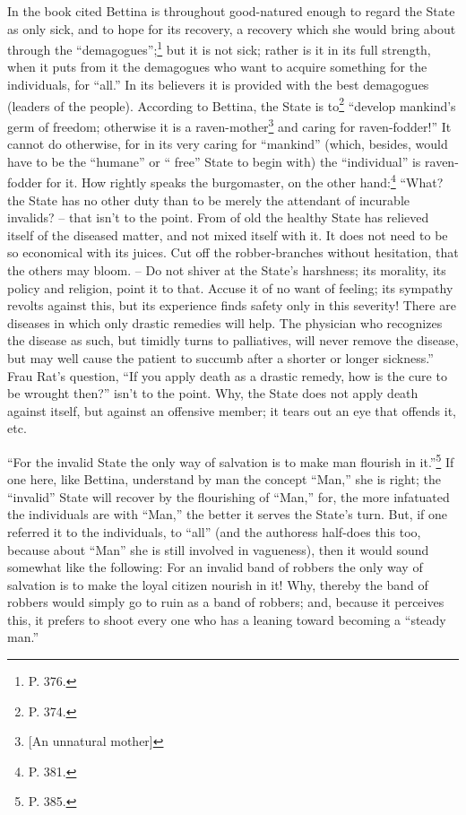 \documentclass[12pt,a4paper]{book}
\begin{document}
In the book cited Bettina is throughout good-natured enough to regard the 
State as only sick, and to hope for its recovery, a recovery which she would 
bring about through the ``demagogues'';\footnote{P. 376.} but it is not 
sick; rather is it in its full strength, when it puts from it the demagogues 
who want to acquire something for the individuals, for ``all.'' In its 
believers it is provided with the best demagogues (leaders of the people). 
According to Bettina, the State is to\footnote{P. 374.} ``develop mankind's 
germ of freedom; otherwise it is a raven-mother\footnote{[An unnatural 
mother]} and caring for raven-fodder!'' It cannot do otherwise, for in its 
very caring for ``mankind'' (which, besides, would have to be the 
``humane'' or `` free'' State to begin with) the ``individual'' is 
raven-fodder for it. How rightly speaks the burgomaster, on the other 
hand:\footnote{P. 381.} ``What? the State has no other duty than to be merely 
the attendant of incurable invalids? -- that isn't to the point. From of old 
the healthy State has relieved itself of the diseased matter, and not mixed 
itself with it. It does not need to be so economical with its juices. Cut off 
the robber-branches without hesitation, that the others may bloom. -- Do not 
shiver at the State's harshness; its morality, its policy and religion, point 
it to that. Accuse it of no want of feeling; its sympathy revolts against 
this, but its experience finds safety only in this severity! There are 
diseases in which only drastic remedies will help. The physician who 
recognizes the disease as such, but timidly turns to palliatives, will never 
remove the disease, but may well cause the patient to succumb after a shorter 
or longer sickness.'' Frau Rat's question, ``If you apply death as a drastic 
remedy, how is the cure to be wrought then?'' isn't to the point. Why, the 
State does not apply death against itself, but against an offensive member; it 
tears out an eye that offends it, etc.

``For the invalid State the only way of salvation is to make man flourish in 
it.''\footnote{P. 385.} If one here, like Bettina, understand by man the 
concept ``Man,'' she is right; the ``invalid'' State will recover by the 
flourishing of ``Man,'' for, the more infatuated the individuals are with 
``Man,'' the better it serves the State's turn. But, if one referred it to 
the individuals, to ``all'' (and the authoress half-does this too, because 
about ``Man'' she is still involved in vagueness), then it would sound 
somewhat like the following: For an invalid band of robbers the only way of 
salvation is to make the loyal citizen nourish in it! Why, thereby the band of 
robbers would simply go to ruin as a band of robbers; and, because it 
perceives this, it prefers to shoot every one who has a leaning toward 
becoming a ``steady man.''
\end{document}
